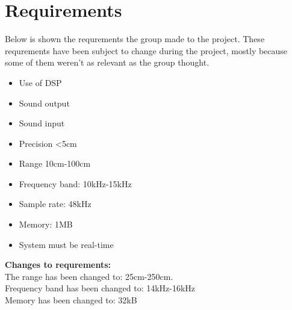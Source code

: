 \section{Requirements}
Below is shown the requrements the group made to the project. These requrements have been subject to change during the project, mostly because some of them weren't as relevant as the group thought.
\begin{itemize}
\item Use of DSP
\item Sound output
\item Sound input
\item Precision <5cm
\item Range 10cm-100cm
\item Frequency band: 10kHz-15kHz
\item Sample rate: 48kHz
\item Memory: 1MB
\item System must be real-time
\end{itemize}
\textbf{Changes to requrements:}\\
The range has been changed to: 25cm-250cm.\\
Frequency band has been changed to: 14kHz-16kHz\\
Memory has been changed to: 32kB\\


